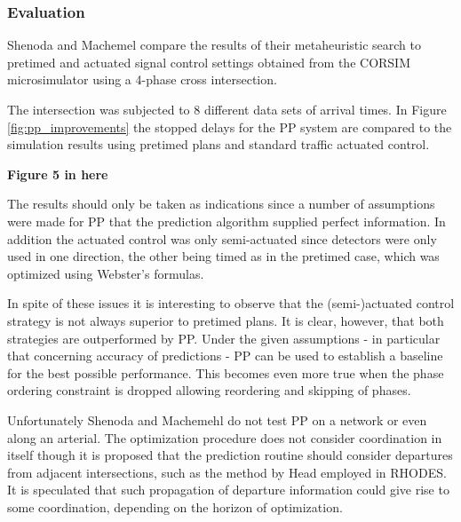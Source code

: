 \subsubsection*{Evaluation}

Shenoda and Machemel compare the results of their metaheuristic
search to pretimed and actuated signal control settings obtained from
the CORSIM microsimulator using a 4-phase cross intersection.


The intersection was subjected to 8 different data sets of arrival
times. In Figure \ref{fig:pp_improvements} the stopped delays for the
PP system are compared to the simulation results using pretimed plans
and standard traffic actuated control.

\begin{center}
{\bf Figure 5 in here}
\end{center}

The results should only be taken as indications since a number of
assumptions were made for PP that the prediction algorithm supplied
perfect information. In addition the actuated control was only
semi-actuated since detectors were only used in one direction, the
other being timed as in the pretimed case, which was optimized using
Webster's formulas.

In spite of these issues it is interesting to observe that the
(semi-)actuated control strategy is not always superior to pretimed
plans. It is clear, however, that both strategies are outperformed by
PP. Under the given assumptions - in particular that concerning
accuracy of predictions - PP can be used to establish a baseline for
the best possible performance. This becomes even more true when the
phase ordering constraint is dropped allowing reordering and skipping
of phases.

Unfortunately Shenoda and Machemehl do not test PP on a network or
even along an arterial. The optimization procedure does not consider
coordination in itself though it is proposed that the prediction
routine should consider departures from adjacent intersections, such
as the method by Head employed in RHODES. It is speculated that such
propagation of departure information could give rise to some
coordination, depending on the horizon of optimization.
